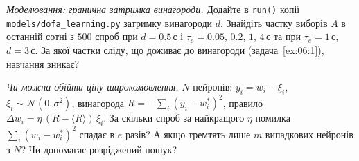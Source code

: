 \begin{exercise}[\lvlB]
\label{ex:06:7}
\emph{Моделювання: гранична затримка винагороди.} Додайте в \texttt{run()} копії \texttt{models/\allowbreak dofa\_learning.py} затримку винагороди $d$. Знайдіть частку виборів $A$ в останній сотні з $500$ спроб при $d=0.5\,\text{с}$ і $\tau_e=0.05$, $0.2$, $1$, $4\,\text{с}$ та при $\tau_e=1\,\text{с}$, $d=3\,\text{с}$. За якої частки сліду, що доживає до винагороди (задача~\ref{ex:06:1}), навчання зникає?
\end{exercise}

\begin{exercise}[\lvlC]
\label{ex:06:8}
\emph{Чи можна обійти ціну широкомовлення.} $N$ нейронів: $y_i=w_i+\xi_i$, $\xi_i\sim\mathcal N(0,\sigma^2)$, винагорода $R=-\sum_i(y_i-w_i^*)^2$, правило $\Delta w_i=\eta\,(R-\langle R\rangle)\,\xi_i$. За скільки спроб за найкращого $\eta$ помилка $\sum_i(w_i-w_i^*)^2$ спадає в $e$ разів? А якщо тремтять лише $m$ випадкових нейронів з $N$? Чи допомагає розріджений пошук?
\end{exercise}
